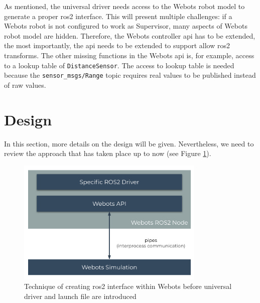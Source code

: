 As mentioned, the universal driver needs access to the Webots robot model to generate a proper \ac{ros2} interface.
This will present multiple challenges:
if a Webots robot is not configured to work as Supervisor, many aspects of Webots robot model are hidden.
Therefore, the Webots controller \ac{api} has to be extended, the most importantly, the \ac{api} needs to be extended to support allow \ac{ros2} transforms.
The other missing functions in the Webots \ac{api} is, for example, access to a lookup table of \texttt{DistanceSensor}.
The access to lookup table is needed because the \texttt{sensor\_msgs/Range} topic requires real values to be published instead of raw values.



\section{Design}

In this section, more details on the design will be given. Nevertheless, we need to review the approach that has taken place up to now (see Figure \ref{fig:generalization:ros2_driver_within_webots}). 

\begin{figure}[H]
    \centering
    \includegraphics[width=0.8\textwidth]{generalization/figures/ros2_driver_within_webots.pdf}
    \caption{Technique of creating \ac{ros2} interface within Webots before universal driver and launch file are introduced}
    \label{fig:generalization:ros2_driver_within_webots}
\end{figure}

